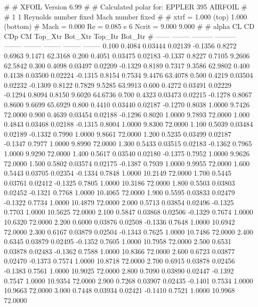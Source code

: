 #  
#       XFOIL         Version 6.99
#  
# Calculated polar for: EPPLER 395 AIRFOIL                              
#  
# 1 1 Reynolds number fixed          Mach number fixed         
#  
# xtrf =   1.000 (top)        1.000 (bottom)  
# Mach =   0.000     Re =     0.085 e 6     Ncrit =   9.000  9.000
#  
#   alpha    CL        CD       CDp       CM     Top_Xtr  Bot_Xtr  Top_Itr  Bot_Itr
#  ------ -------- --------- --------- -------- -------- -------- -------- --------
   0.100   0.4084   0.03444   0.02139  -0.1356   0.8272   0.6963   9.1471  62.3168
   0.200   0.4051   0.03475   0.02183  -0.1337   0.8227   0.7105   9.2606  62.5842
   0.300   0.4098   0.03497   0.02209  -0.1329   0.8189   0.7317   9.3586  62.9802
   0.400   0.4138   0.03500   0.02224  -0.1315   0.8154   0.7534   9.4476  63.4078
   0.500   0.4219   0.03504   0.02232  -0.1309   0.8122   0.7829   9.5285  63.9913
   0.600   0.4272   0.03491   0.02229  -0.1294   0.8094   0.8150   9.6020  64.6736
   0.700   0.4323   0.03473   0.02215  -0.1278   0.8067   0.8600   9.6699  65.6929
   0.800   0.4410   0.03440   0.02187  -0.1270   0.8038   1.0000   9.7426  72.0000
   0.900   0.4639   0.03454   0.02188  -0.1296   0.8020   1.0000   9.7893  72.0000
   1.000   0.4843   0.03468   0.02188  -0.1315   0.8004   1.0000   9.8300  72.0000
   1.100   0.5039   0.03484   0.02189  -0.1332   0.7990   1.0000   9.8661  72.0000
   1.200   0.5235   0.03499   0.02187  -0.1347   0.7977   1.0000   9.8990  72.0000
   1.300   0.5433   0.03515   0.02183  -0.1362   0.7965   1.0000   9.9290  72.0000
   1.400   0.5617   0.03540   0.02180  -0.1375   0.7952   1.0000   9.9626  72.0000
   1.500   0.5802   0.03574   0.02175  -0.1387   0.7939   1.0000   9.9955  72.0000
   1.600   0.5443   0.03705   0.02354  -0.1334   0.7848   1.0000  10.2149  72.0000
   1.700   0.5445   0.03761   0.02412  -0.1325   0.7805   1.0000  10.3186  72.0000
   1.800   0.5503   0.03803   0.02452  -0.1321   0.7768   1.0000  10.4065  72.0000
   1.900   0.5595   0.03833   0.02479  -0.1322   0.7734   1.0000  10.4879  72.0000
   2.000   0.5713   0.03854   0.02496  -0.1325   0.7703   1.0000  10.5625  72.0000
   2.100   0.5847   0.03868   0.02506  -0.1329   0.7674   1.0000  10.6320  72.0000
   2.200   0.6000   0.03876   0.02508  -0.1336   0.7648   1.0000  10.6942  72.0000
   2.300   0.6167   0.03879   0.02504  -0.1343   0.7625   1.0000  10.7486  72.0000
   2.400   0.6345   0.03879   0.02495  -0.1352   0.7605   1.0000  10.7958  72.0000
   2.500   0.6531   0.03878   0.02483  -0.1362   0.7588   1.0000  10.8366  72.0000
   2.600   0.6723   0.03877   0.02470  -0.1373   0.7574   1.0000  10.8718  72.0000
   2.700   0.6915   0.03878   0.02456  -0.1383   0.7561   1.0000  10.9025  72.0000
   2.800   0.7090   0.03890   0.02447  -0.1392   0.7547   1.0000  10.9354  72.0000
   2.900   0.7268   0.03907   0.02435  -0.1401   0.7534   1.0000  10.9663  72.0000
   3.000   0.7448   0.03934   0.02421  -0.1410   0.7521   1.0000  10.9968  72.0000
